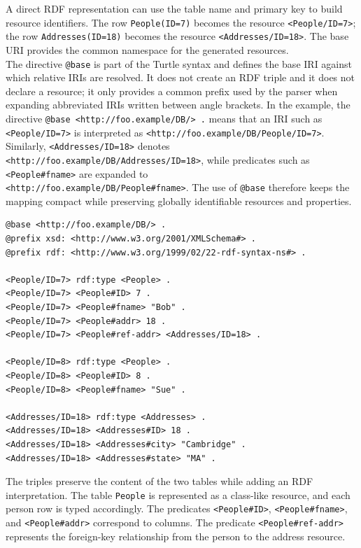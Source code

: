 \documentclass{scrbook}
\begin{document}
	A direct RDF representation can use the table name and primary key to build resource identifiers. The row \texttt{People(ID=7)} becomes the resource \texttt{<People/ID=7>}; the row \texttt{Addresses(ID=18)} becomes the resource \texttt{<Addresses/ID=18>}. The base URI provides the common namespace for the generated resources.\\
	
	The directive \texttt{@base} is part of the Turtle syntax and defines the base IRI against which relative IRIs are resolved. It does not create an RDF triple and it does not declare a resource; it only provides a common prefix used by the parser when expanding abbreviated IRIs written between angle brackets. In the example, the directive \texttt{@base <http://foo.example/DB/> .} means that an IRI such as \texttt{<People/ID=7>} is interpreted as \texttt{<http://foo.example/DB/People/ID=7>}. Similarly, \texttt{<Addresses/ID=18>} denotes \texttt{<http://foo.example/DB/Addresses/ID=18>}, while predicates such as \texttt{<People\#fname>} are expanded to\\
	\texttt{<http://foo.example/DB/People\#fname>}. The use of \texttt{@base} therefore keeps the mapping compact while preserving globally identifiable resources and properties.
	
	\begin{lstlisting}
@base <http://foo.example/DB/> .
@prefix xsd: <http://www.w3.org/2001/XMLSchema#> .
@prefix rdf: <http://www.w3.org/1999/02/22-rdf-syntax-ns#> .

<People/ID=7> rdf:type <People> .
<People/ID=7> <People#ID> 7 .
<People/ID=7> <People#fname> "Bob" .
<People/ID=7> <People#addr> 18 .
<People/ID=7> <People#ref-addr> <Addresses/ID=18> .

<People/ID=8> rdf:type <People> .
<People/ID=8> <People#ID> 8 .
<People/ID=8> <People#fname> "Sue" .
	
<Addresses/ID=18> rdf:type <Addresses> .
<Addresses/ID=18> <Addresses#ID> 18 .
<Addresses/ID=18> <Addresses#city> "Cambridge" .
<Addresses/ID=18> <Addresses#state> "MA" .
	\end{lstlisting}
	
	The triples preserve the content of the two tables while adding an RDF interpretation. The table \texttt{People} is represented as a class-like resource, and each person row is typed accordingly. The predicates \texttt{<People\#ID>}, \texttt{<People\#fname>}, and \texttt{<People\#addr>} correspond to columns. The predicate \texttt{<People\#ref-addr>} represents the foreign-key relationship from the person to the address resource.\\
	
\end{document}
